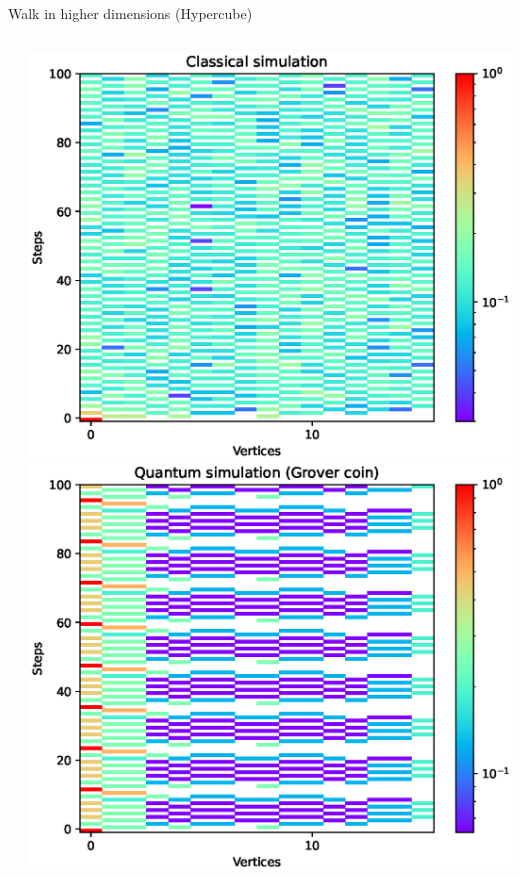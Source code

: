 \documentclass[aspectratio=169]{beamer}
\begin{document}
\begin{frame}{Walk in higher dimensions (Hypercube)}
  \begin{columns}[onlytextwidth]
    \begin{column}{.20\textwidth}
    \end{column}
    \begin{column}{.30\textwidth}
      \includegraphics[width=\textwidth]{./figures/results/hypercube/classical.eps}
      \vspace{-1em} %
      \includegraphics[width=\textwidth]{./figures/results/hypercube/grover.eps}

\end{column}
\end{columns}
\end{frame}
\end{document}
